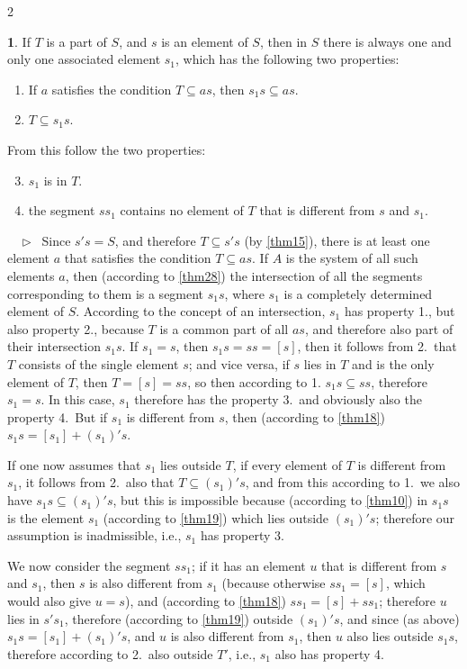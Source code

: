 \documentclass[leqno,hidelinks,10pt]{article}
\theoremstyle{definition}
\newtheorem{satz}{\protect\satzname}
\newcommand{\satzname}{}
\renewcommand{\satzname}{\hspace{-4pt}.\ Satz}%
\renewcommand{\satzname}{\hspace{-4pt}.\ Theorem}%
\newcommand\beweis{ $ \phantom{'.'} \rhd \ $}%
\newcommand{\partof}{\subseteq}
\newcommand{\sref}[1]{\underline{\ref{#1}}}%
\begin{document}
\begin{paracol}{2}
\begin{rightcolumn}
\begin{satz}\label{thm29}
If $T$ is a part of $S$, and $s$ is an element of $S$, then in $S$ there is always
one and only one associated element $s_1$, which has the following two properties:
\begin{enumerate} \setcounter{enumi}{0} \setlength\itemsep{-0.25em}
  \item If $a$ satisfies the condition $T \partof as$, then $s_1s \partof as$.
  \item $T \partof s_1s$.
\end{enumerate}
From this follow the two properties:
\begin{enumerate} \setcounter{enumi}{2} \setlength\itemsep{-0.25em}
  \item $s_1$ is in $T$.
  \item the segment $ss_1$ contains no element of $T$ that is different from $s$ and $s_1$.
\end{enumerate}
\beweis
Since $s's = S$, and therefore $T \partof s's$ (by \sref{thm15}), there is at least
one element $a$ that satisfies the condition $T \partof as$. If $A$ is the system
of all such elements $a$, then (according to \sref{thm28}) the intersection of
all the segments corresponding to them is a segment $s_1s$, where $s_1$ is a
completely determined element of $S$. According to the concept of an intersection,
$s_1$ has property 1., but also property 2., because $T$ is a common part of
all $as$, and therefore also part of their intersection $s_1s$. If $s_1 = s$,
then $s_1s = ss = [s]$, then it follows from 2.\ that $T$ consists of the single
element $s$; and vice versa, if $s$ lies in $T$ and is the only element of $T$,
then $T = [s] = ss$, so then according to 1. $s_1s \partof ss$, therefore $s_1 = s$.
In this case, $s_1$ therefore has the property 3.\ and obviously also the property
4.\ But if $s_1$ is different from $s$, then (according to \sref{thm18})
$s_1s = [s_1] + (s_1)'s$.

If one now assumes that $s_1$ lies outside $T$, if every element of $T$ is
different from $s_1$, it follows from 2.\ also that $T \partof (s_1)'s$, and from
this according to 1.\ we also have $s_1s \partof (s_1)'s$, but this is impossible
because (according to \sref{thm10}) in $s_1s$ is the element $s_1$ (according to
\sref{thm19}) which lies outside $(s_1)'s$; therefore our assumption is inadmissible,
i.e., $s_1$ has property 3.

We now consider the segment $ss_1$; if it has an element $u$ that is different
from $s$ and $s_1$, then $s$ is also different from $s_1$ (because otherwise
$ss_1 = [s]$, which would also give $u=s$), and (according to \sref{thm18})
$ss_1 = [s] + ss_1$; therefore $u$ lies in $s's_1$, therefore (according to
\sref{thm19}) outside $(s_1)'s$, and since (as above) $s_1s= [s_1] + (s_1)'s$,
and $u$ is also different from $s_1$, then $u$ also lies outside $s_1s$, therefore
according to 2.\ also outside $T'$, i.e., $s_1$ also has property 4.
\end{satz}


\end{rightcolumn}
\end{paracol}
\end{document}
